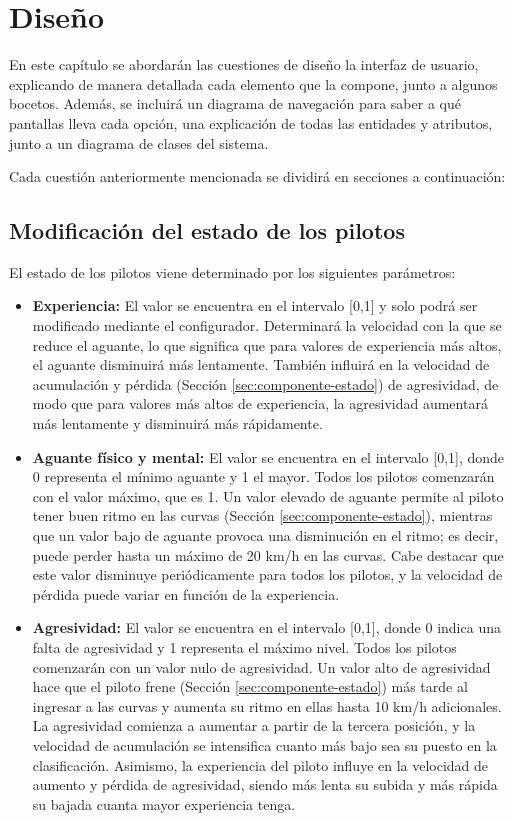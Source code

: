 \chapter{Diseño}

En este capítulo se abordarán las cuestiones de diseño la interfaz de usuario, explicando de manera detallada cada elemento que la compone, junto a algunos bocetos. Además, se incluirá un diagrama de navegación para saber a qué pantallas lleva cada opción, una explicación de todas las entidades y atributos, junto a un diagrama de clases del sistema.

\bigskip

Cada cuestión anteriormente mencionada se dividirá en secciones a continuación:

\section{Modificación del estado de los pilotos}
El estado de los pilotos viene determinado por los siguientes parámetros:

\begin{itemize}
    \item \textbf{Experiencia: }El valor se encuentra en el intervalo [0,1] y solo podrá ser modificado mediante el configurador. Determinará la velocidad con la que se reduce el aguante, lo que significa que para valores de experiencia más altos, el aguante disminuirá más lentamente. También influirá en la velocidad de acumulación y pérdida (Sección \ref{sec:componente-estado}) de agresividad, de modo que para valores más altos de experiencia, la agresividad aumentará más lentamente y disminuirá más rápidamente.
    
    \item \textbf{Aguante físico y mental: }El valor se encuentra en el intervalo [0,1], donde 0 representa el mínimo aguante y 1 el mayor. Todos los pilotos comenzarán con el valor máximo, que es 1. Un valor elevado de aguante permite al piloto tener buen ritmo en las curvas (Sección \ref{sec:componente-estado}), mientras que un valor bajo de aguante provoca una disminución en el ritmo; es decir, puede perder hasta un máximo de 20 km/h en las curvas. Cabe destacar que este valor disminuye periódicamente para todos los pilotos, y la velocidad de pérdida puede variar en función de la experiencia.
    
    \item \textbf{Agresividad: }El valor se encuentra en el intervalo [0,1], donde 0 indica una falta de agresividad y 1 representa el máximo nivel. Todos los pilotos comenzarán con un valor nulo de agresividad. Un valor alto de agresividad hace que el piloto frene (Sección \ref{sec:componente-estado}) más tarde al ingresar a las curvas y aumenta su ritmo en ellas hasta 10 km/h adicionales. La agresividad comienza a aumentar a partir de la tercera posición, y la velocidad de acumulación se intensifica cuanto más bajo sea su puesto en la clasificación. Asimismo, la experiencia del piloto influye en la velocidad de aumento y pérdida de agresividad, siendo más lenta su subida y más rápida su bajada cuanta mayor experiencia tenga.
\end{itemize}

